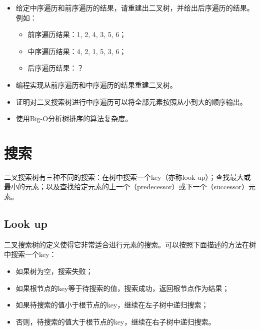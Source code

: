 \documentclass[UTF8]{article}
\begin{document}
\begin{Exercise}

\begin{itemize}
\item 给定中序遍历和前序遍历的结果，请重建出二叉树，并给出后序遍历的结果。例如：
\begin{itemize}
\item 前序遍历结果：1, 2, 4, 3, 5, 6；
\item 中序遍历结果：4, 2, 1, 5, 3, 6；
\item 后序遍历结果：？
\end{itemize}

\item 编程实现从前序遍历和中序遍历的结果重建二叉树。

\item 证明对二叉搜索树进行中序遍历可以将全部元素按照从小到大的顺序输出。

\item 使用Big-O分析树排序的算法复杂度。
\end{itemize}
\end{Exercise}

\section{搜索}

二叉搜索树有三种不同的搜索：在树中搜索一个key（亦称look up）；查找最大或最小的元素；以及查找给定元素的上一个（predecessor）或下一个（successor）元素。

\subsection{Look up}
二叉搜索树的定义使得它非常适合进行元素的搜索。可以按照下面描述的方法在树中搜索一个key：

\begin{itemize}
\item 如果树为空，搜索失败；
\item 如果根节点的key等于待搜索的值，搜索成功，返回根节点作为结果；
\item 如果待搜索的值小于根节点的key，继续在左子树中递归搜索；
\item 否则，待搜索的值大于根节点的key，继续在右子树中递归搜索。
\end{itemize}
\end{document}
